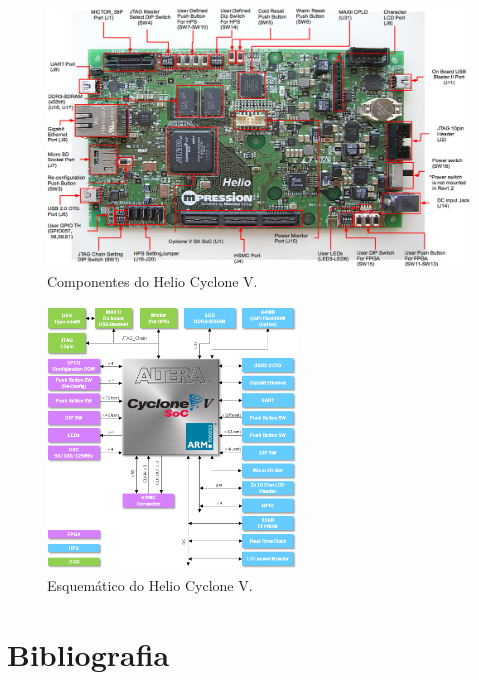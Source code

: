 \documentclass[aspectratio=169]{beamer}
\begin{document}
	\begin{frame}%
		\begin{figure}[h]
			\centering
			\includegraphics[width=1\textwidth]{img/imobilis/helio-foto-2.png}
			\caption{Componentes do Helio Cyclone V.}
			\label{fig:helio-foto2}
		\end{figure}
	\end{frame}
	
	\begin{frame}%
		\begin{figure}[h]
			\centering
			\includegraphics[width=0.59\textwidth]{img/imobilis/helio-esquematico.png}
			\caption{Esquemático do Helio Cyclone V.}
			\label{fig:helio-esquematico}
		\end{figure}
	\end{frame}
	
	
\maketitle

\section{Bibliografia}




\maketitle
\end{document}
